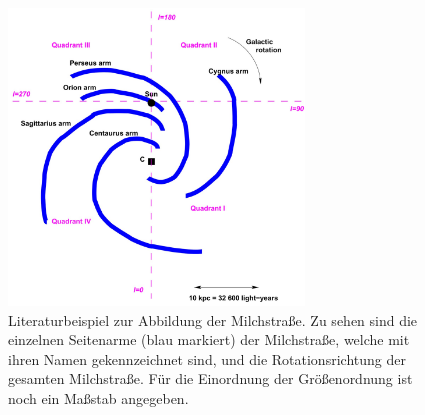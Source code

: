 \begin{figure}[H]
    \centering
    \includegraphics[width= 0.7\textwidth]{pngplots/milchstrasselit.png}   
    \caption[Literaturbeispiel zur Abbildung der Milchstraße]{Literaturbeispiel zur Abbildung der Milchstraße. Zu sehen sind die einzelnen Seitenarme (blau markiert) der Milchstraße, welche mit ihren Namen gekennzeichnet sind, und die Rotationsrichtung der gesamten Milchstraße. Für die Einordnung der Größenordnung ist noch ein Maßstab angegeben. \cite{H1}}
    \label{fig:Milchstrasselit}
\end{figure}